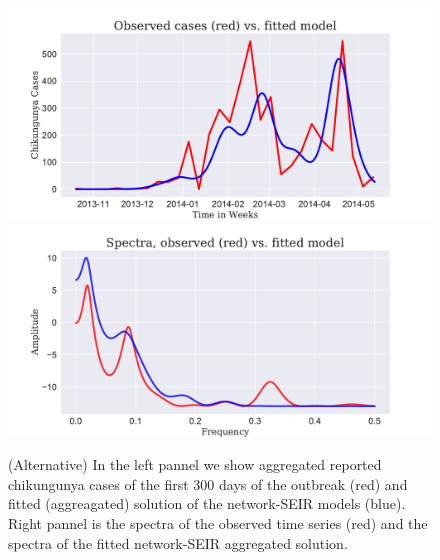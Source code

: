 \documentclass[11pt]{article}
\begin{document}
\vspace{2cm}

\begin{figure}[ht]
\centering
\includegraphics[scale=.24]{./observed_vs_fitted_st}
\includegraphics[scale=.24]{./spectra_obs_vs_sim}
\caption{\small (Alternative) In the left pannel we show aggregated reported chikungunya cases of the first 300 days of the outbreak (red) and fitted (aggreagated) solution of the network-SEIR models (blue).  Right pannel is the spectra of the observed time series (red)  and the spectra of the fitted network-SEIR aggregated solution.}
\label{fig:data-model-spectra-alt}
\end{figure}

\vspace{4cm}
\end{document}
